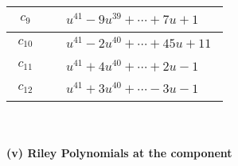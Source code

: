 \documentclass[1p]{elsarticle_modified}
\theoremstyle{definition}
\begin{document}
\begin{tabular}{m{50pt}|m{274pt}}
\hline $$\begin{aligned}c_{9}\end{aligned}$$&$\begin{aligned}
&u^{41}-9 u^{39}+\cdots+7 u+1
\end{aligned}$\\
\hline $$\begin{aligned}c_{10}\end{aligned}$$&$\begin{aligned}
&u^{41}-2 u^{40}+\cdots+45 u+11
\end{aligned}$\\
\hline $$\begin{aligned}c_{11}\end{aligned}$$&$\begin{aligned}
&u^{41}+4 u^{40}+\cdots+2 u-1
\end{aligned}$\\
\hline $$\begin{aligned}c_{12}\end{aligned}$$&$\begin{aligned}
&u^{41}+3 u^{40}+\cdots-3 u-1
\end{aligned}$\\
\hline
\end{tabular}\\~\\
\newpage\renewcommand{\arraystretch}{1}
\flushleft \textbf{(v) Riley Polynomials at the component}\newline \\
\end{document}
